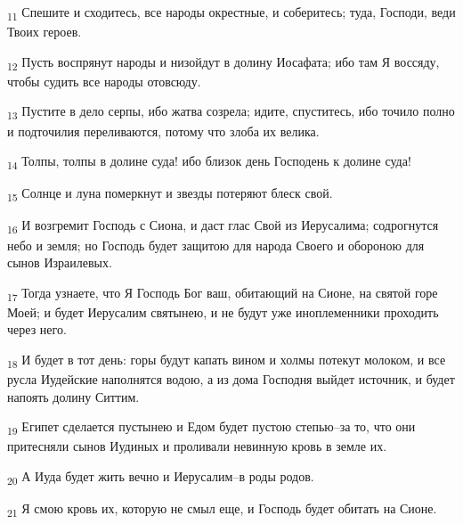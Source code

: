 \begin{tcolorbox}
\textsubscript{11} Спешите и сходитесь, все народы окрестные, и соберитесь; туда, Господи, веди Твоих героев.
\end{tcolorbox}
\begin{tcolorbox}
\textsubscript{12} Пусть воспрянут народы и низойдут в долину Иосафата; ибо там Я воссяду, чтобы судить все народы отовсюду.
\end{tcolorbox}
\begin{tcolorbox}
\textsubscript{13} Пустите в дело серпы, ибо жатва созрела; идите, спуститесь, ибо точило полно и подточилия переливаются, потому что злоба их велика.
\end{tcolorbox}
\begin{tcolorbox}
\textsubscript{14} Толпы, толпы в долине суда! ибо близок день Господень к долине суда!
\end{tcolorbox}
\begin{tcolorbox}
\textsubscript{15} Солнце и луна померкнут и звезды потеряют блеск свой.
\end{tcolorbox}
\begin{tcolorbox}
\textsubscript{16} И возгремит Господь с Сиона, и даст глас Свой из Иерусалима; содрогнутся небо и земля; но Господь будет защитою для народа Своего и обороною для сынов Израилевых.
\end{tcolorbox}
\begin{tcolorbox}
\textsubscript{17} Тогда узнаете, что Я Господь Бог ваш, обитающий на Сионе, на святой горе Моей; и будет Иерусалим святынею, и не будут уже иноплеменники проходить через него.
\end{tcolorbox}
\begin{tcolorbox}
\textsubscript{18} И будет в тот день: горы будут капать вином и холмы потекут молоком, и все русла Иудейские наполнятся водою, а из дома Господня выйдет источник, и будет напоять долину Ситтим.
\end{tcolorbox}
\begin{tcolorbox}
\textsubscript{19} Египет сделается пустынею и Едом будет пустою степью--за то, что они притесняли сынов Иудиных и проливали невинную кровь в земле их.
\end{tcolorbox}
\begin{tcolorbox}
\textsubscript{20} А Иуда будет жить вечно и Иерусалим--в роды родов.
\end{tcolorbox}
\begin{tcolorbox}
\textsubscript{21} Я смою кровь их, которую не смыл еще, и Господь будет обитать на Сионе.
\end{tcolorbox}
